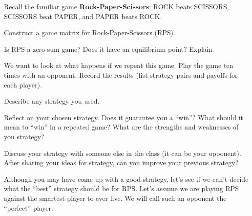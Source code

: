 




Recall the familiar game \textbf{Rock-Paper-Scissors}: ROCK beats SCISSORS, SCISSORS beat PAPER, and PAPER beats ROCK.

\begin{xca}\label{E:RPSmatrix}
Construct a game matrix for Rock-Paper-Scissors (RPS).
\end{xca}

\begin{xca}\label{E:RPSzs} 
Is RPS a zero-sum game? Does it have an equilibrium point? Explain.
\end{xca}

\begin{xca}\label{E:RPSplay}
We want to look at what happens if we repeat this game. Play the game ten times with an opponent. Record the results (list strategy pairs and payoffs for each player).
\end{xca}

\begin{xca}\label{E:RPSconjstrat}
Describe any strategy you used.
\end{xca}

\begin{xca}\label{E:RPSreflect}
Reflect on your chosen strategy. Does it guarantee you a ``win''? What should it mean to ``win'' in a repeated game? What are the strengths and weaknesses of you strategy? 
\end{xca}

\begin{xca}\label{E:RPSshare}
Discuss your strategy with someone else in the class (it can be your opponent). After sharing your ideas for strategy, can you improve your previous strategy?
\end{xca}



Although you may have come up with a good strategy, let's see if we can't decide what the ``best'' strategy should be for RPS. Let's assume we are playing RPS against the smartest player to ever live. We will call such an opponent the ``perfect'' player.



